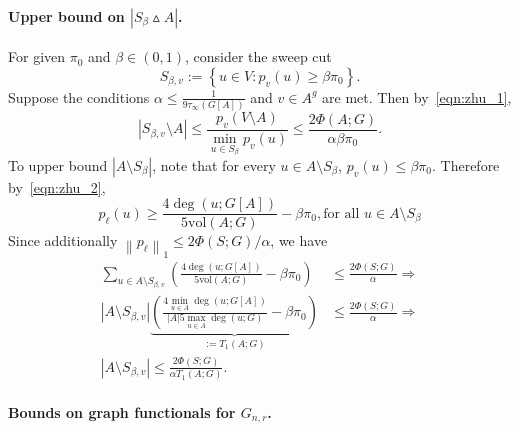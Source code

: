 \documentclass[11pt,twoside]{article}
\theoremstyle{definition}
\newcommand{\set}[1]{\left\{#1\right\}}
\newcommand{\vol}{\mathrm{vol}}
\newcommand{\abs}[1]{\left \lvert #1 \right \rvert}
\newcommand{\norm}[1]{\left\lVert#1\right\rVert}
\newcommand{\1}{\mathbbm{1}}
\begin{document}
\paragraph{Upper bound on $\abs{S_{\beta} \vartriangle A}$.}

For given $\pi_0$ and $\beta \in (0,1)$, consider the sweep cut
\begin{equation*}
S_{\beta,v} := \set{u \in V: p_v(u) \geq \beta \pi_0}.
\end{equation*}
Suppose the conditions $\alpha \leq \frac{1}{9\tau_{\infty}(G[A])}$ and $v \in A^g$ are met. Then by~\eqref{eqn:zhu_1},
\begin{equation}
\label{eqn:zhu_3}
\abs{S_{\beta,v} \setminus A} \leq \frac{p_v(V \setminus A)}{\min_{u \in S_{\beta}}p_v(u)} \leq \frac{2 \Phi(A;G)}{\alpha \beta \pi_0}. 
\end{equation}
To upper bound $\abs{A \setminus S_{\beta}}$, note that for every $u \in A \setminus S_{\beta}$, $p_v(u) \leq \beta \pi_0$. Therefore by~\eqref{eqn:zhu_2},
\begin{equation*}
p_{\ell}(u) \geq \frac{4\deg(u;G[A])}{5\vol(A;G)} - \beta\pi_0, \textrm{for all $u \in A \setminus S_{\beta}$}
\end{equation*}
Since additionally $\norm{p_{\ell}}_1 \leq 2\Phi(S;G)/\alpha$, we have
\begin{align}
\sum_{u \in A \setminus S_{\beta,v}} \left(\frac{4\deg(u;G[A])}{5\vol(A;G)} - \beta\pi_0\right) & \leq \frac{2\Phi(S;G)}{\alpha} \nonumber \Longrightarrow\\
\abs{A \setminus S_{\beta,v}}\underbrace{\left(\frac{4\min_{u \in A}\deg(u;G[A])}{\abs{A}5\max_{u \in A}\deg(u;G)} - \beta\pi_0\right)}_{:=T_1(A;G)} & \leq \frac{2\Phi(S;G)}{\alpha} \Longrightarrow \nonumber \\
\abs{A \setminus S_{\beta,v}} \leq \frac{2\Phi(S;G)}{\alpha T_1(A;G)} .
\label{eqn:zhu_4}
\end{align}

\paragraph{Bounds on graph functionals for $G_{n,r}$.}
\end{document}

